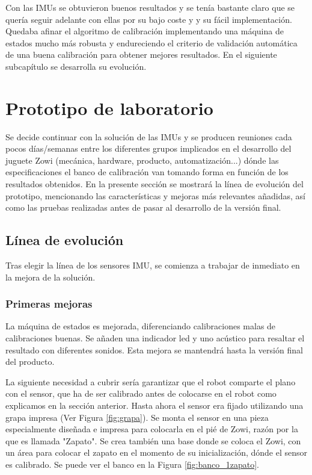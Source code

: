 Con las IMUs se obtuvieron buenos resultados y se tenía bastante claro que se quería seguir adelante con ellas por su bajo coste y y su fácil implementación. Quedaba afinar el algoritmo de calibración implementando una máquina de estados mucho más robusta y endureciendo el criterio de validación automática de una buena calibración para obtener mejores resultados. En el siguiente subcapítulo se desarrolla su evolución.


\section{Prototipo de laboratorio}

Se decide continuar con la solución de las IMUs y se producen reuniones cada pocos días/semanas entre los diferentes grupos implicados en el desarrollo del juguete Zowi (mecánica, hardware, producto, automatización...) dónde las especificaciones el banco de calibración van tomando forma en función de los resultados obtenidos. En la presente sección se mostrará la línea de evolución del prototipo, mencionando las características y mejoras más relevantes añadidas, así como las pruebas realizadas antes de pasar al desarrollo de la versión final.

\subsection{Línea de evolución}

Tras elegir la línea de los sensores IMU, se comienza a trabajar de inmediato en la mejora de la solución.

\subsubsection{Primeras mejoras}

La máquina de estados es mejorada, diferenciando calibraciones malas de calibraciones buenas. Se añaden una indicador led y uno acústico para resaltar el resultado con diferentes sonidos. Esta mejora se mantendrá hasta la versión final del producto.

La siguiente necesidad a cubrir sería garantizar que el robot comparte el plano con el sensor, que ha de ser calibrado antes de colocarse en el robot como explicamos en la sección anterior. Hasta ahora el sensor era fijado utilizando una grapa impresa (Ver Figura \ref{fig:grapa}).
Se monta el sensor en una pieza especialmente diseñada e impresa para colocarla en el pié de Zowi, razón por la que es llamada "Zapato".
Se crea también una base donde se coloca el Zowi, con un área para colocar el zapato en el momento de su inicialización, dónde el sensor es calibrado. Se puede ver el banco en la Figura \ref{fig:banco_1zapato}.


